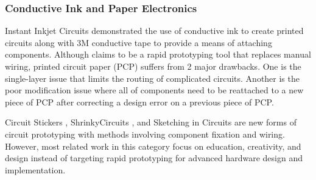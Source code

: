 \subsubsection{Conductive Ink and Paper Electronics}
Instant Inkjet Circuits \cite{Instant_Inkjet_Circuits} demonstrated the use of conductive ink to create printed circuits along with 3M conductive tape to provide a means of attaching components.
Although \cite{Instant_Inkjet_Circuits} claims to be a rapid prototyping tool that replaces manual wiring, printed circuit paper (PCP) suffers from 2 major drawbacks. One is the single-layer issue that limits the routing of complicated circuits. Another is the poor modification issue where all of components need to be reattached to a new piece of PCP after correcting a design error on a previous piece of PCP.



Circuit Stickers \cite{Circuit_Stickers}, ShrinkyCircuits \cite{ShrinkyCircuits}, and Sketching in Circuits \cite{Sketching_in_Circuits} are new forms of circuit prototyping with methods involving component fixation and wiring.
However, most related work in this category focus on education, creativity, and design instead of targeting rapid prototyping for advanced hardware design and implementation.

